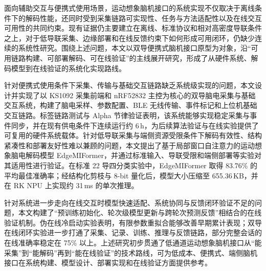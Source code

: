 \begin{cabstract}
面向辅助交互与便携式使用场景，运动想象脑机接口的系统实现不仅取决于离线条件下的解码性能，还同时受到采集链路可实现性、任务与方法适配性以及在线交互可用性的共同约束。现有证据仍主要建立在离线、标准协议和相对高密度导联条件之上，对于低导联采集、边缘部署和在线反馈约束下如何形成可用闭环，仍缺少连续的系统性研究。围绕上述问题，本文以双导便携式脑机接口原型为对象，沿“可用链路构建、可部署解码、可在线验证”的主线展开研究，形成了从硬件系统、解码模型到在线验证的系统化实现路线。

针对便携式使用条件下采集、传输与基础交互链路缺乏系统级实现的问题，本文设计并实现了以 KS1092 采集前端和 nRF52832 主控为核心的双导脑电采集与基础交互系统，构建了脑电采样、参数配置、BLE 无线传输、事件标记和上位机基础交互链路。标签链路测试与 Alpha 节律验证表明，该系统能够实现稳定采集与事件同步，并在现有供电条件下连续运行约 6\,h，为后续算法验证与在线实验提供了可复用的硬件系统载体。针对低导联采集与端侧资源受限条件下解码有效性、结构紧凑性和部署友好性难以兼顾的问题，本文提出了基于局部窗口自注意力的运动想象脑电解码模型 EdgeMIFormer，并通过标准输入、导联受限和端侧部署等实验对其适用性进行验证。在标准 22 导四分类实验中，EdgeMIFormer 取得 83.76\% 的平均最佳准确率；经结构化剪枝与 8-bit 量化后，模型大小压缩至 655.36\,KB，并在 RK NPU 上实现约 31\,ms 的单次推理。

针对系统进一步走向在线交互时模型快速适配、系统协同与反馈闭环验证不足的问题，本文构建了“预训练初始化、轮次级模型更新与跨轮次预测反馈”相结合的在线验证机制。伪在线冷启动实验表明，有限参数重拟合能够改善早期累计表现；双导在线闭环实验进一步打通了采集、记录、训练、推理与反馈链路，部分完整会话的在线准确率稳定在 75\% 以上。上述研究初步贯通了低通道运动想象脑机接口从“能采集”到“能解码”再到“能在线验证”的技术路线，可为低成本、便携式、端侧脑机接口在系统构建、模型设计、部署实现和在线验证方面提供参考。

\end{cabstract}


